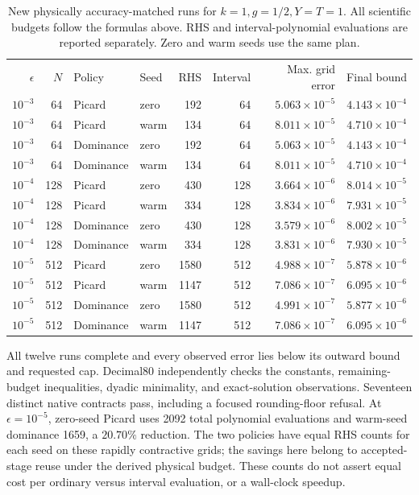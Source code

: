 \begin{table}[t]
\caption{New physically accuracy-matched runs for $k=1,g=1/2,Y=T=1$.
All scientific budgets follow the formulas above. RHS and interval-polynomial
evaluations are reported separately. Zero and warm seeds use the same plan.}
\label{tab:cubic-physical-constants}
\begin{ruledtabular}
\begin{tabular}{rrllrrrr}
$\epsilon$ & $N$ & Policy & Seed & RHS & Interval & Max. grid error & Final bound\\
$10^{-3}$&64&Picard&zero&192&64&$5.063\times10^{-5}$&$4.143\times10^{-4}$\\
$10^{-3}$&64&Picard&warm&134&64&$8.011\times10^{-5}$&$4.710\times10^{-4}$\\
$10^{-3}$&64&Dominance&zero&192&64&$5.063\times10^{-5}$&$4.143\times10^{-4}$\\
$10^{-3}$&64&Dominance&warm&134&64&$8.011\times10^{-5}$&$4.710\times10^{-4}$\\
$10^{-4}$&128&Picard&zero&430&128&$3.664\times10^{-6}$&$8.014\times10^{-5}$\\
$10^{-4}$&128&Picard&warm&334&128&$3.834\times10^{-6}$&$7.931\times10^{-5}$\\
$10^{-4}$&128&Dominance&zero&430&128&$3.579\times10^{-6}$&$8.002\times10^{-5}$\\
$10^{-4}$&128&Dominance&warm&334&128&$3.831\times10^{-6}$&$7.930\times10^{-5}$\\
$10^{-5}$&512&Picard&zero&1580&512&$4.988\times10^{-7}$&$5.878\times10^{-6}$\\
$10^{-5}$&512&Picard&warm&1147&512&$7.086\times10^{-7}$&$6.095\times10^{-6}$\\
$10^{-5}$&512&Dominance&zero&1580&512&$4.991\times10^{-7}$&$5.877\times10^{-6}$\\
$10^{-5}$&512&Dominance&warm&1147&512&$7.086\times10^{-7}$&$6.095\times10^{-6}$\\
\end{tabular}
\end{ruledtabular}
\end{table}

All twelve runs complete and every observed error lies below its outward
bound and requested cap. Decimal80 independently checks the constants,
remaining-budget inequalities, dyadic minimality, and exact-solution
observations. Seventeen distinct native contracts pass, including a focused
rounding-floor refusal. At $\epsilon=10^{-5}$, zero-seed Picard uses 2092
total polynomial evaluations and warm-seed dominance 1659, a $20.70\%$
reduction. The two policies have equal RHS counts for each seed on these
rapidly contractive grids; the savings here belong to accepted-stage reuse
under the derived physical budget. These counts do not assert equal cost per
ordinary versus interval evaluation, or a wall-clock speedup.
